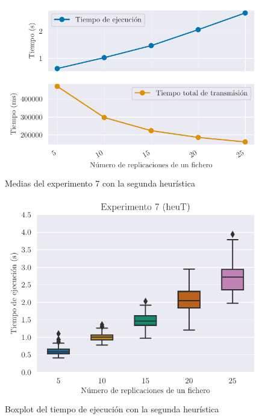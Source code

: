 \begin{figure}[H]
    \centering
    \includegraphics{include/plots/ex7_means_n.pdf}
    \caption{Medias del experimento 7 con la segunda heurística}%
    \label{fig:ex7means_total}
\end{figure}

\begin{figure}[H]
    \centering
    \includegraphics{include/plots/ex7_time_bplot_n.pdf}
    \caption{Boxplot del tiempo de ejecución con la segunda heurística}%
    \label{fig:ex7time_total}
\end{figure}

